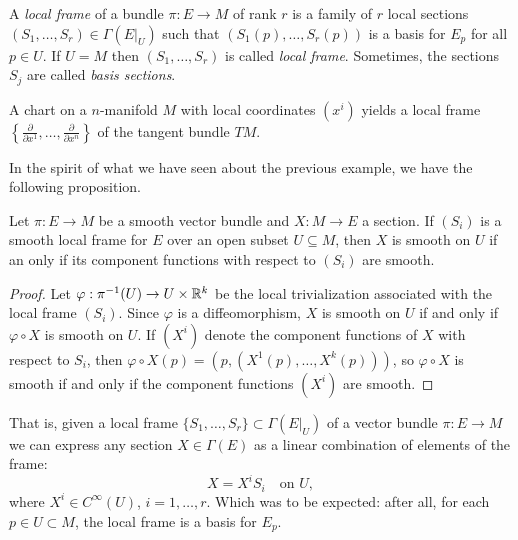 \begin{definition}
  A \emph{local frame} of a bundle $\pi:E\to M$ of rank $r$ is a family of $r$ local sections $(S_1, \ldots, S_r)\in\Gamma(E|_U)$ such that $(S_1(p), \ldots, S_r(p))$ is a basis for $E_p$ for all $p\in U$.
  If $U=M$ then $(S_1, \ldots, S_r)$ is called \emph{local frame}.
  Sometimes, the sections $S_j$ are called \emph{basis sections}.
\end{definition}

\begin{example}
  A chart on a $n$-manifold $M$ with local coordinates $(x^i)$ yields a local frame $\left\{\frac{\partial}{\partial x^1}, \ldots, \frac{\partial}{\partial x^n}\right\}$ of the tangent bundle $TM$.
\end{example}

In the spirit of what we have seen about the previous example, we have the following proposition.

\begin{proposition}
  Let $\pi:E \to M$ be a smooth vector bundle and $X:M\to E$ a section.
  If $(S_i)$ is a smooth local frame for $E$ over an open subset $U\subseteq M$, then $X$ is smooth on $U$ if an only if its component functions with respect to $(S_i)$ are smooth.
\end{proposition}
\begin{proof}
   Let $\varphi:\pi^{-1}(U) \to U\times\mathbb{R}^k$ be the local trivialization associated with the local frame $(S_i)$. Since $\varphi$ is a diffeomorphism, $X$ is smooth on $U$ if and only if $\varphi\circ X$ is smooth on $U$. If $(X^i)$ denote the component functions of $X$ with respect to $S_i$, then $\varphi\circ X (p) = (p, (X^1(p), \ldots, X^k(p)))$, so $\varphi\circ X$ is smooth if and only if the component functions $(X^i)$ are smooth.
\end{proof}

That is, given a local frame $\{S_1, \ldots, S_r\}\subset\Gamma(E|_U)$ of a vector bundle $\pi: E \to M$ we can express any section $X\in\Gamma(E)$ as a linear combination of elements of the frame:
\begin{equation}
  X = X^i S_i \quad\mbox{on }U,
\end{equation}
where $X^i\in C^\infty(U)$, $i=1,\ldots,r$.
Which was to be expected: after all, for each $p\in U\subset M$, the local frame is a basis for $E_p$.

